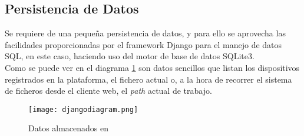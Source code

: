 \subsection{Persistencia de Datos}
Se requiere de una pequeña persistencia de datos, y para ello se aprovecha las facilidades proporcionadas por el framework Django para el manejo de datos SQL, en este caso, haciendo uso del motor de base de datos SQLite3.\\

Como se puede ver en el diagrama \ref{fig:djangodiagram} son datos sencillos que listan los dispositivos registrados en la plataforma, el fichero actual o, a la hora de recorrer el sistema de ficheros desde el cliente web, el \textit{path} actual de trabajo.

\begin{figure}[h!]
\begin{center}
\texttt{[image: djangodiagram.png]}
\end{center}
\caption[Datos almacenados en \studio]{Datos almacenados en \studio}
\label{fig:djangodiagram}
\end{figure}